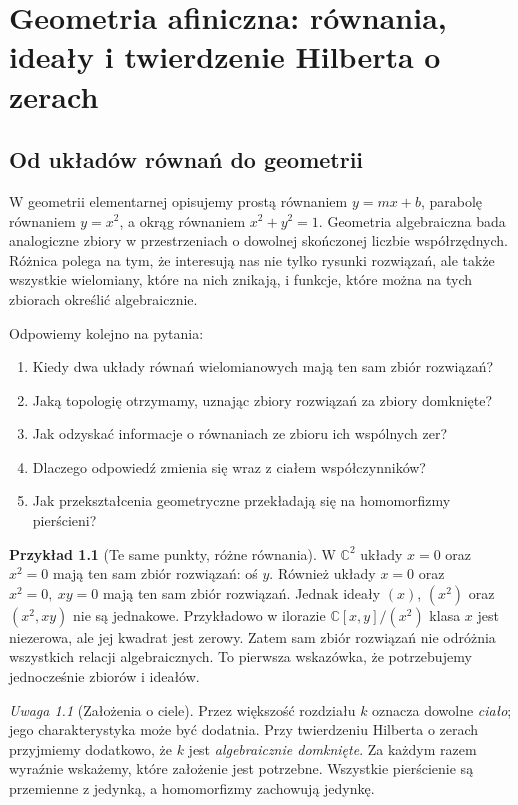 \documentclass[11pt,a4paper,openany]{report}
\numberwithin{equation}{section}
\theoremstyle{plain}
\theoremstyle{definition}
\newtheorem{przyklad}[twierdzenie]{Przykład}
\theoremstyle{remark}
\newtheorem{uwaga}[twierdzenie]{Uwaga}
\newcommand{\C}{\mathbb C}
\begin{document}
\chapter{Geometria afiniczna: równania, ideały i twierdzenie Hilberta o zerach}
\label{ch:afiniczna}
\section{Od układów równań do geometrii}

W geometrii elementarnej opisujemy prostą równaniem $y=mx+b$, parabolę
równaniem $y=x^2$, a okrąg równaniem $x^2+y^2=1$. Geometria algebraiczna
bada analogiczne zbiory w przestrzeniach o dowolnej skończonej liczbie
współrzędnych. Różnica polega na tym, że interesują nas nie tylko
rysunki rozwiązań, ale także wszystkie wielomiany, które na nich znikają,
i funkcje, które można na tych zbiorach określić algebraicznie.

Odpowiemy kolejno na pytania:
\begin{enumerate}[label=\arabic*)]
\item Kiedy dwa układy równań wielomianowych mają ten sam zbiór rozwiązań?
\item Jaką topologię otrzymamy, uznając zbiory rozwiązań za zbiory domknięte?
\item Jak odzyskać informacje o równaniach ze zbioru ich wspólnych zer?
\item Dlaczego odpowiedź zmienia się wraz z ciałem współczynników?
\item Jak przekształcenia geometryczne przekładają się na homomorfizmy pierścieni?
\end{enumerate}

\begin{przyklad}[Te same punkty, różne równania]
W $\C^2$ układy $x=0$ oraz $x^2=0$ mają ten sam zbiór
rozwiązań: oś $y$. Również układy $x=0$ oraz $x^2=0,\ xy=0$
mają ten sam zbiór rozwiązań. Jednak ideały $(x)$, $(x^2)$ oraz
$(x^2,xy)$ nie są jednakowe. Przykładowo w ilorazie
$\C[x,y]/(x^2)$ klasa $x$ jest niezerowa, ale jej kwadrat jest zerowy.
Zatem sam zbiór rozwiązań nie odróżnia wszystkich relacji algebraicznych.
To pierwsza wskazówka, że potrzebujemy jednocześnie zbiorów i ideałów.
\end{przyklad}

\begin{uwaga}[Założenia o ciele]
Przez większość rozdziału $k$ oznacza dowolne \emph{ciało}; jego
charakterystyka może być dodatnia. Przy twierdzeniu Hilberta o zerach
przyjmiemy dodatkowo, że $k$ jest \emph{algebraicznie domknięte}.
Za każdym razem wyraźnie wskażemy, które założenie jest potrzebne.
Wszystkie pierścienie są przemienne z jedynką, a homomorfizmy zachowują jedynkę.
\end{uwaga}
\end{document}
